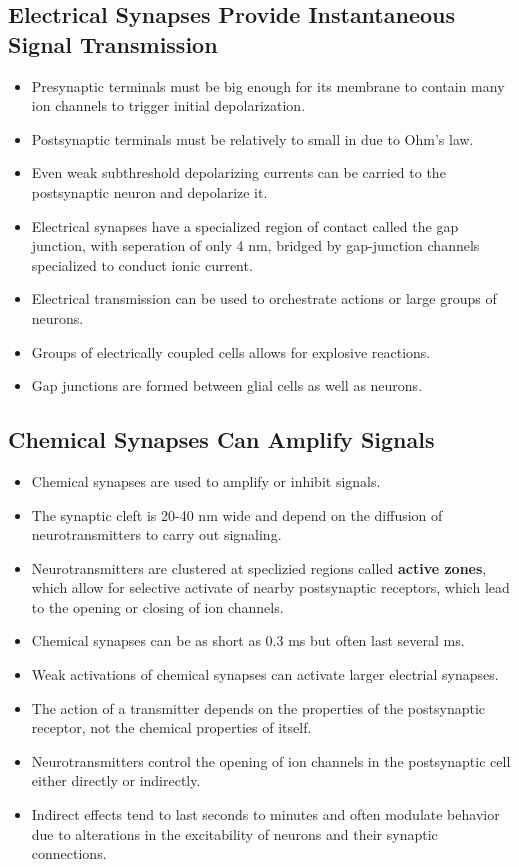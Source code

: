 \documentclass[12pt,a4paper]{article}
\begin{document}
\subsection{Electrical Synapses Provide Instantaneous Signal Transmission}
\begin{itemize}
    \item Presynaptic terminals must be big enough for its membrane to contain many ion channels to trigger initial depolarization.
    \item Postsynaptic terminals must be relatively to small in due to Ohm's law.
    \item Even weak subthreshold depolarizing currents can be carried to the postsynaptic neuron and depolarize it.
    \item Electrical synapses have a specialized region of contact called the gap junction, with seperation of only 4 nm, bridged by gap-junction channels specialized to conduct ionic current.
    \item Electrical transmission can be used to orchestrate actions or large groups of neurons.
    \item Groups of electrically coupled cells allows for explosive reactions.
    \item Gap junctions are formed between glial cells as well as neurons.
\end{itemize}
\subsection{Chemical Synapses Can Amplify Signals}
\begin{itemize}
    \item Chemical synapses are used to amplify or inhibit signals. 
    \item The synaptic cleft is 20-40 nm wide and depend on the diffusion of neurotransmitters to carry out signaling.
    \item Neurotransmitters are clustered at speclizied regions called \textbf{active zones}, which allow for selective activate of nearby postsynaptic receptors, which lead to the opening or closing of ion channels.
    \item Chemical synapses can be as short as 0.3 ms but often last several ms.
    \item Weak activations of chemical synapses can activate larger electrial synapses. 
    \item The action of a transmitter depends on the properties of the postsynaptic receptor, not the chemical properties of itself.
    \item Neurotransmitters control the opening of ion channels in the postsynaptic cell either directly or indirectly.
    \item Indirect effects tend to last seconds to minutes and often modulate behavior due to alterations in the excitability of neurons and their synaptic connections.
\end{itemize}
\end{document}
